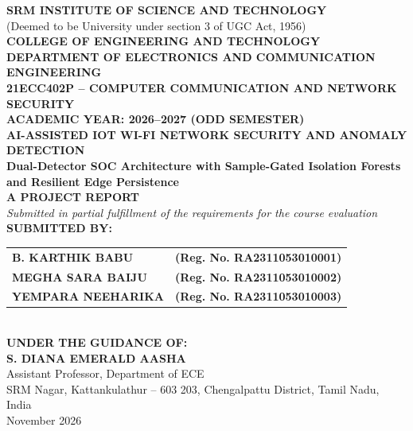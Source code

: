 \documentclass[11pt,a4paper]{report}
\begin{document}
\begin{titlepage}
\centering
\vspace*{0.3cm}

{\Large \textbf{SRM INSTITUTE OF SCIENCE AND TECHNOLOGY}}\\[0.15cm]
{\small (Deemed to be University under section 3 of UGC Act, 1956)}\\[0.25cm]
{\large \textbf{COLLEGE OF ENGINEERING AND TECHNOLOGY}}\\[0.15cm]
{\large \textbf{DEPARTMENT OF ELECTRONICS AND COMMUNICATION ENGINEERING}}\\[0.8cm]

{\Large \textbf{21ECC402P -- COMPUTER COMMUNICATION AND NETWORK SECURITY}}\\[0.2cm]
{\large \textbf{ACADEMIC YEAR: 2026--2027 (ODD SEMESTER)}}\\[0.8cm]

{\LARGE \textbf{AI-ASSISTED IOT WI-FI NETWORK SECURITY AND ANOMALY DETECTION}}\\[0.35cm]
{\large \textbf{Dual-Detector SOC Architecture with Sample-Gated Isolation Forests and Resilient Edge Persistence}}\\[0.9cm]

{\large \textbf{A PROJECT REPORT}}\\[0.2cm]
{\normalsize \textit{Submitted in partial fulfillment of the requirements for the course evaluation}}\\[0.8cm]

\textbf{SUBMITTED BY:}\\[0.2cm]
\begin{tabular}{ll}
\textbf{B. KARTHIK BABU} & \textbf{(Reg. No. RA2311053010001)} \\
\textbf{MEGHA SARA BAIJU} & \textbf{(Reg. No. RA2311053010002)} \\
\textbf{YEMPARA NEEHARIKA} & \textbf{(Reg. No. RA2311053010003)} \\
\end{tabular}\\[0.9cm]

\textbf{UNDER THE GUIDANCE OF:}\\[0.15cm]
\textbf{S. DIANA EMERALD AASHA}\\[0.1cm]
{\normalsize Assistant Professor, Department of ECE}\\[0.8cm]

{\normalsize SRM Nagar, Kattankulathur -- 603 203, Chengalpattu District, Tamil Nadu, India}\\[0.15cm]
{\normalsize November 2026}

\end{titlepage}
\end{document}
